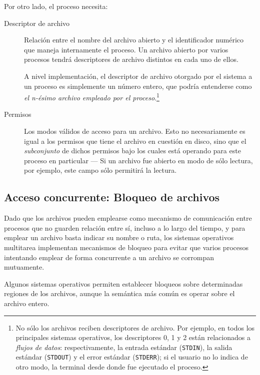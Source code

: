 \documentclass[11pt,fleqn]{book} %
\begin{document}
Por otro lado, el proceso necesita:

\begin{description}
\item[Descriptor de archivo] Relación entre el nombre del archivo
     abierto y el identificador numérico que maneja internamente el
     proceso. Un archivo abierto por varios procesos tendrá
     descriptores de archivo distintos en cada uno de ellos.

     A nivel implementación, el descriptor de archivo otorgado por el
     sistema a un proceso es simplemente un número entero, que podría
     entenderse como \emph{el n-ésimo archivo empleado por el      proceso}.\footnote{No sólo los archivos reciben descriptores de
     archivo. Por ejemplo, en todos los principales sistemas
     operativos, los descriptores 0, 1 y 2 están relacionados a
     \emph{flujos de datos}: respectivamente, la entrada estándar
     (\texttt{STDIN}), la salida estándar (\texttt{STDOUT}) y el error estándar
     (\texttt{STDERR}); si el usuario no lo indica de otro modo, la terminal
     desde donde fue ejecutado el proceso. }
\item[Permisos] Los modos válidos de acceso para un archivo. Esto no
              necesariamente es igual a los permisos que tiene el
              archivo en cuestión en disco, sino que el \emph{subconjunto}
              de dichos permisos bajo los cuales está operando para
              este proceso en particular — Si un archivo fue abierto
              en modo de sólo lectura, por ejemplo, este campo
              sólo permitirá la lectura.
\end{description}
\subsection{Acceso concurrente: Bloqueo de archivos}
\label{sec-6-2-3}
\label{DIR_bloq_arch}


Dado que los archivos pueden emplearse como mecanismo de comunicación
entre procesos que no guarden relación entre sí, incluso a lo largo
del tiempo, y para emplear un archivo basta indicar su nombre o ruta,
los sistemas operativos multitarea implementan mecanismos de bloqueo
para evitar que varios procesos intentando emplear de forma
concurrente a un archivo se corrompan mutuamente.

Algunos sistemas operativos permiten establecer bloqueos sobre
determinadas regiones de los archivos, aunque la semántica más común
es operar sobre el archivo entero.
\end{document}
